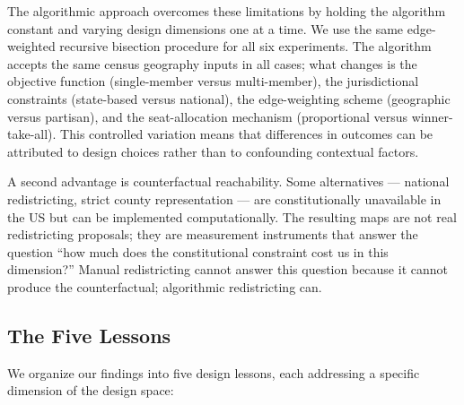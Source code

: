 The algorithmic approach overcomes these limitations by holding the algorithm
constant and varying design dimensions one at a time.  We use the same
edge-weighted recursive bisection procedure \citep{karypis1998fast,
dellaLibera2026mec} for all six experiments.  The algorithm accepts the same
census geography inputs in all cases; what changes is the objective function
(single-member versus multi-member), the jurisdictional constraints (state-based
versus national), the edge-weighting scheme (geographic versus partisan), and
the seat-allocation mechanism (proportional versus winner-take-all).  This
controlled variation means that differences in outcomes can be attributed to
design choices rather than to confounding contextual factors.

A second advantage is counterfactual reachability.  Some alternatives ---
national redistricting, strict county representation --- are constitutionally
unavailable in the US but can be implemented computationally.  The resulting
maps are not real redistricting proposals; they are measurement instruments
that answer the question ``how much does the constitutional constraint cost us
in this dimension?''  Manual redistricting cannot answer this question because
it cannot produce the counterfactual; algorithmic redistricting can.

\subsection{The Five Lessons}

We organize our findings into five design lessons, each addressing a specific
dimension of the design space:

